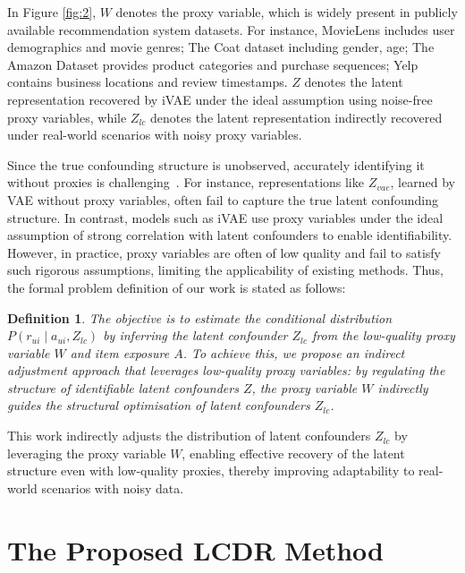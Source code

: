 \documentclass[sigconf]{acmart}
\newtheorem{definition}{Definition}
\begin{document}
In Figure \ref{fig:2}, $W$ denotes the proxy variable, which is widely present in publicly available recommendation system datasets. For instance, MovieLens includes user demographics and movie genres; The Coat dataset including gender, age; The Amazon Dataset provides product categories and purchase sequences; Yelp contains business locations and review timestamps.
$Z$ denotes the latent representation recovered by iVAE under the ideal assumption using noise-free proxy variables, while $Z_{lc}$ denotes the latent representation indirectly recovered under real-world scenarios with noisy proxy variables.


Since the true confounding structure is unobserved, accurately identifying it without proxies is challenging~\cite{9}. For instance, representations like $Z_{vae}$, learned by VAE without proxy variables, often fail to capture the true latent confounding structure. In contrast, models such as iVAE use proxy variables under the ideal assumption of strong correlation with latent confounders to enable identifiability.
However, in practice, proxy variables are often of low quality and fail to satisfy such rigorous assumptions, limiting the applicability of existing methods.
Thus, the formal problem definition of our work is stated as follows: 




\begin{definition}
The objective is to estimate the conditional distribution \( P(r_{ui} \mid a_{ui}, Z_{lc}) \) by inferring the latent confounder \( Z_{lc} \) from the low-quality proxy variable \( W \) and item exposure \( A \). To achieve this, we propose an indirect adjustment approach that leverages low-quality proxy variables: by regulating the structure of identifiable latent confounders \( Z \), the proxy variable \( W \) indirectly guides the structural optimisation of latent confounders $Z_{lc}$.
\end{definition}



This work indirectly adjusts the distribution of latent confounders $Z_{lc}$ by leveraging the proxy variable $W$, enabling effective recovery of the latent structure even with low-quality proxies, thereby improving adaptability to real-world scenarios with noisy data.



\section{The Proposed LCDR Method}
\end{document}
